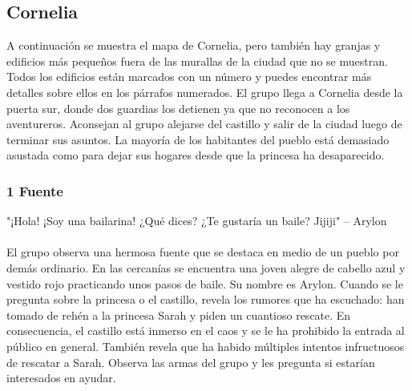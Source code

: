 \subsection*{Cornelia}
A continuación se muestra el mapa de Cornelia, pero también hay granjas y edificios más pequeños fuera de las murallas de la ciudad que no se muestran. Todos los edificios están marcados con un número y puedes encontrar más detalles sobre ellos en los párrafos numerados. El grupo llega a Cornelia desde la puerta sur, donde dos guardias los detienen ya que no reconocen a los aventureros. Aconsejan al grupo alejarse del castillo y salir de la ciudad luego de terminar sus asuntos. La mayoría de los habitantes del pueblo está demasiado asustada como para dejar sus hogares desde que la princesa ha desaparecido.
\begin{center} 
\end{center}
\subsubsection*{1 Fuente}
"¡Hola! ¡Soy una bailarina! ¿Qué dices? ¿Te gustaría un baile? Jijiji" -- Arylon \\ \\
El grupo observa una hermosa fuente que se destaca en medio de un pueblo por demás ordinario. En las cercanías se encuentra una joven alegre de cabello azul y vestido rojo practicando unos pasos de baile. Su nombre es Arylon. Cuando se le pregunta sobre la princesa o el castillo, revela los rumores que ha escuchado: han tomado de rehén a la princesa Sarah y piden un cuantioso rescate. En consecuencia, el castillo está inmerso en el caos y se le ha prohibido la entrada al público en general. También revela que ha habido múltiples intentos infructuosos de rescatar a Sarah. Observa las armas del grupo y les pregunta si estarían interesados en ayudar.

